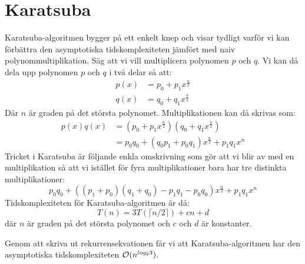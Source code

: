 \section{Karatsuba}
Karatsuba-algoritmen bygger på ett enkelt knep och visar tydligt varför vi kan
förbättra den asymptotiska tidskomplexiteten jämfört med naiv
polynommultiplikation. Säg att vi vill multiplicera polynomen $p$ och $q$. Vi
kan då dela upp polynomen $p$ och $q$ i två delar så att:
\begin{align*}
  p(x) &= p_0 + p_1 x^{\frac{n}{2}} \\
  q(x) &= q_0 + q_1 x^{\frac{n}{2}}
\end{align*}
Där $n$ är graden på det största polynomet. Multiplikationen kan då skrivas
som:
\begin{align*}
p(x)q(x) &= (p_0 + p_1 x^{\frac{n}{2}})(q_0 + q_1 x^{\frac{n}{2}}) \\
         &= p_0 q_0  + (q_0 p_1 +p_0 q_1 )  x^{\frac{n}{2}} + p_1 q_1  x^n
\end{align*}
Tricket i Karatsuba är följande enkla omskrivning som gör att vi blir av med en
multiplikation så att vi istället för fyra multiplikationer bara har tre
distinkta multiplikationer:
\begin{equation*}
  p_0 q_0 + ((p_1 + p_0)(q_1 + q_0) - p_1 q_1 - p_0 q_0)  x^{\frac{n}{2}} + p_1 q_1  x^n
\end{equation*}
Tidskomplexiteten för Karatsuba-algoritmen är då:
\begin{equation*}
  T(n) = 3 T(\lceil n/2\rceil) + cn + d
\end{equation*}
där $n$ är graden på det största polynomet och $c$ och $d$ är konstanter.

Genom att skriva ut rekurrensekvationen får vi att Karatsuba-algoritmen har den
asymptotiska tidskomplexiteten $\mathcal{O}(n^{log_2 3})$.
